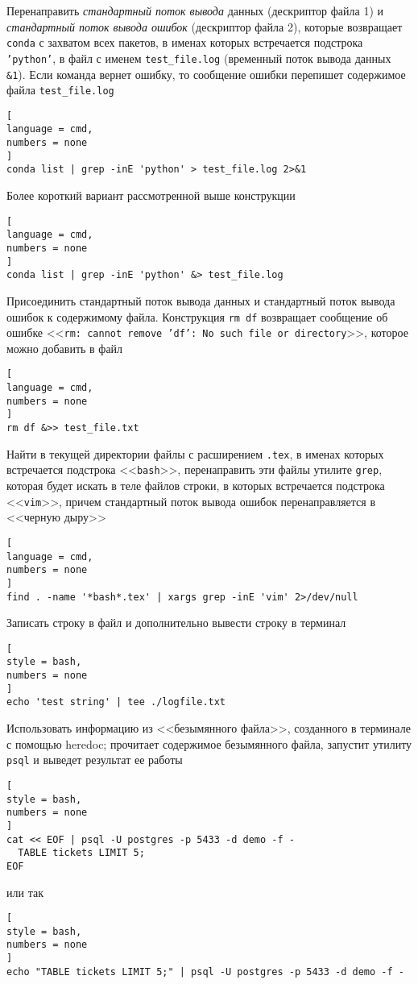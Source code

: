 \documentclass[%
	11pt,
	a4paper,
	utf8,
		]{article}
\begin{document}
Перенаправить \emph{стандартный поток вывода} данных (дескриптор файла 1) и \emph{стандартный поток вывода ошибок} (дескриптор файла 2), которые возвращает \texttt{conda} с захватом всех пакетов, в именах которых встречается подстрока \texttt{'python'}, в файл с именем \texttt{test\_file.log} (временный поток вывода данных \texttt{\&1}). Если команда вернет ошибку, то сообщение ошибки перепишет содержимое файла \texttt{test\_file.log}
\begin{lstlisting}[
language = cmd,
numbers = none
]
conda list | grep -inE 'python' > test_file.log 2>&1
\end{lstlisting}

Более короткий вариант рассмотренной выше конструкции
\begin{lstlisting}[
language = cmd,
numbers = none
]
conda list | grep -inE 'python' &> test_file.log
\end{lstlisting}

Присоединить стандартный поток вывода данных и стандартный поток вывода ошибок к содержимому файла. Конструкция \texttt{rm df} возвращает сообщение об ошибке <<\texttt{rm: cannot remove 'df': No such file or directory}>>, которое можно добавить в файл
\begin{lstlisting}[
language = cmd,
numbers = none
]
rm df &>> test_file.txt
\end{lstlisting}

Найти в текущей директории файлы с расширением \texttt{.tex}, в именах которых встречается подстрока <<\texttt{bash}>>, перенаправить эти файлы утилите \texttt{grep}, которая будет искать в теле файлов строки, в которых встречается подстрока <<\texttt{vim}>>, причем стандартный поток вывода ошибок перенаправляется в <<черную дыру>>
\begin{lstlisting}[
language = cmd,
numbers = none
]
find . -name '*bash*.tex' | xargs grep -inE 'vim' 2>/dev/null
\end{lstlisting}

Записать строку в файл и дополнительно вывести строку в терминал
\begin{lstlisting}[
style = bash,
numbers = none
]
echo 'test string' | tee ./logfile.txt
\end{lstlisting}

Использовать информацию из <<безымянного файла>>, созданного в терминале с помощью heredoc; прочитает содержимое безымянного файла, запустит утилиту \texttt{psql} и выведет результат ее работы
\begin{lstlisting}[
style = bash,
numbers = none	
]
cat << EOF | psql -U postgres -p 5433 -d demo -f -
  TABLE tickets LIMIT 5;
EOF
\end{lstlisting}
или так
\begin{lstlisting}[
style = bash,
numbers = none
]
echo "TABLE tickets LIMIT 5;" | psql -U postgres -p 5433 -d demo -f -
\end{lstlisting}
\end{document}
